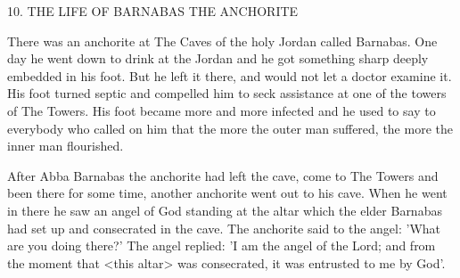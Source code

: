 10. THE LIFE OF BARNABAS THE ANCHORITE

There was an anchorite at The Caves of the holy Jordan called
Barnabas. One day he went down to drink at the Jordan and he got
something sharp deeply embedded in his foot. But he left it there,
and would not let a doctor examine it. His foot turned septic and
compelled him to seck assistance at one of the towers of The
Towers. His foot became more and more infected and he used to
say to everybody who called on him that the more the outer man
suffered, the more the inner man flourished.

After Abba Barnabas the anchorite had left the cave, come to
The Towers and been there for some time, another anchorite went
out to his cave. When he went in there he saw an angel of God
standing at the altar which the elder Barnabas had set up and
consecrated in the cave. The anchorite said to the angel: 'What are
you doing there?' The angel replied: 'I am the angel of the Lord;
and from the moment that <this altar> was consecrated, it was
entrusted to me by God'.
